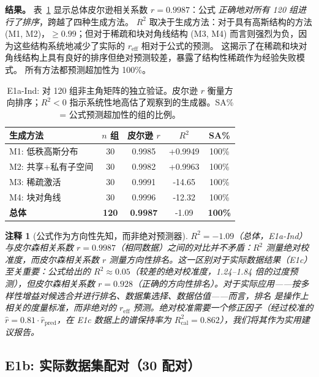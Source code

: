 \documentclass{article}
\newtheorem{remark}{注释}
\begin{document}
\textbf{结果。}
表~\ref{tab:e1a_ind} 显示总体皮尔逊相关系数 $r=0.9987$：公式 \emph{正确地对所有 120 组进行了排序}，跨越了四种生成方法。
$R^2$ 取决于生成方法：对于具有高斯结构的方法 (M1, M2)，$\geq0.99$；但对于稀疏和块对角线结构 (M3, M4) 而言则强烈为负，因为这些结构系统地减少了实际的 $r_{\mathrm{eff}}$ 相对于公式的预测。
这揭示了在稀疏和块对角线结构上具有良好的排序但绝对预测较差，暴露了结构性稀疏作为经验失败模式。
所有方法都预测超加性为 100\%。

\begin{table}[t]
\centering
\caption{E1a-Ind: 对 120 组非主角矩阵的独立验证。皮尔逊 $r$ 衡量方向排序；$R^2<0$ 指示系统性地高估了观察到的生成器。SA\% = 公式预测超加性的组的比例。}
\label{tab:e1a_ind}
\setlength{\tabcolsep}{5pt}
\begin{tabular}{lcccc}
\toprule
生成方法 & $n$ 组 & 皮尔逊 $r$ & $R^2$ & SA\% \\
\midrule
M1: 低秩高斯分布      & 30 & 0.9985 & +0.9949 & 100\% \\
M2: 共享+私有子空间 & 30 & 0.9982 & +0.9963 & 100\% \\
M3: 稀疏激活     & 30 & 0.9991 & -14.65  & 100\% \\
M4: 块对角线         & 30 & 0.9996 & -12.32  & 100\% \\
\midrule
\textbf{总体}           & \textbf{120} & \textbf{0.9987} & -1.09 & \textbf{100\%} \\
\bottomrule
\end{tabular}
\end{table}
\begin{remark}[公式作为方向性先知，而非绝对预测器]
\label{rem:r2_vs_pearson}
$R^2=-1.09$（总体，E1a-Ind）与皮尔森相关系数 $r=0.9987$（相同数据）之间的对比并不矛盾：$R^2$ 测量绝对校准度，而皮尔森相关系数 $r$ 测量方向性排名。这一区别对于实际数据结果（E1c）至关重要：公式给出的 $R^2\approx0.05$（较差的绝对校准度，1.24--1.84 倍的过度预测），但皮尔森相关系数 $r=0.928$（正确的方向性排名）。对于实际应用——按多样性增益对候选合并进行排名、数据集选择、数据估值——而言，\emph{排名} 是操作上相关的度量标准，而非绝对的 $r_{\mathrm{eff}}$ 预测。绝对校准需要一个修正因子（经过校准的 $\hat{r}=0.81 \cdot \hat{r}_{\mathrm{pred}}$，在 E1c 数据上的谱保持率为 $R^2_{\mathrm{cal}}=0.862$），我们将其作为实用建议报告。
\end{remark}

\subsection{E1b: 实际数据集配对（30 配对）}
\label{sec:e1b}
\end{document}
